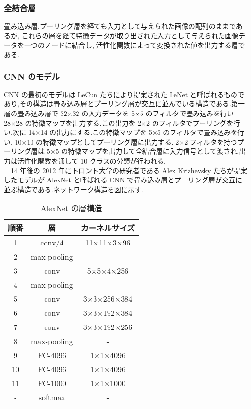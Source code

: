 \subsubsection{全結合層}
畳み込み層,プーリング層を経ても入力として与えられた画像の配列のままであるが,
これらの層を経て特徴データが取り出された入力として与えられた画像データを一つのノードに結合し,
活性化関数によって変換された値を出力する層である.\\
\subsubsection{CNN のモデル}
CNN の最初のモデルは LeCun たちにより提案された LeNet と呼ばれるものであり,その構造は畳み込み層とプーリング層が交互に並んでいる構造である.第一層の畳み込み層で 32×32 の入力データを 5×5  のフィルタで畳み込みを行い 28×28 の特徴マップを出力する.この出力を 2×2 のフィルタでプーリングを行い,次に 14×14 の出力にする.この特徴マップを 5×5 のフィルタで畳み込みを行い, 10×10 の特徴マップとしてプーリング層に出力する. 2×2 フィルタを持つプーリング層は 5×5 の特徴マップを出力して全結合層に入力信号として渡され,出力は活性化関数を通して 10 クラスの分類が行われる.\\
　14 年後の 2012 年にトロント大学の研究者である Alex Krizhevsky たちが提案したモデルが AlexNet と呼ばれる CNN で畳み込み層とプーリング層が交互に並ぶ構造である.ネットワーク構造を図に示す.
\begin{table}[!t]
  \begin{center}
  \caption{AlexNet の層構造}
  \begin{tabular}{|c|c|c|} \hline
    順番 & 層 & カーネルサイズ \\ \hline
    1 & conv/4 & 11×11×3×96 \\ \hline
    2 & max-pooling & - \\ \hline
    3 & conv & 5×5×4×256 \\ \hline
    4 & max-pooling & - \\ \hline
    5 & conv & 3×3×256×384 \\ \hline
    6 & conv & 3×3×192×384 \\ \hline
    7 & conv & 3×3×192×256 \\ \hline
    8 & max-pooling & - \\ \hline
    9 & FC-4096 & 1×1×4096 \\ \hline
    10 & FC-4096 & 1×1×4096 \\ \hline
    11 & FC-1000 & 1×1×1000 \\ \hline
    - & softmax & - \\ \hline
  \end{tabular}
  \end{center}
\end{table}
